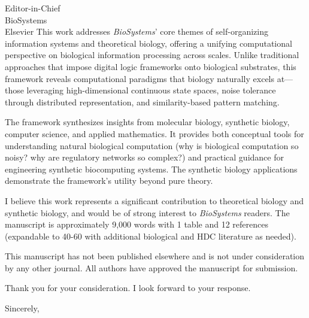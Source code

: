 \documentclass[11pt]{letter}
\begin{document}
\begin{letter}{Editor-in-Chief\\BioSystems\\Elsevier}
This work addresses \textit{BioSystems}' core themes of self-organizing information systems and theoretical biology, offering a unifying computational perspective on biological information processing across scales. Unlike traditional approaches that impose digital logic frameworks onto biological substrates, this framework reveals computational paradigms that biology naturally excels at—those leveraging high-dimensional continuous state spaces, noise tolerance through distributed representation, and similarity-based pattern matching.

The framework synthesizes insights from molecular biology, synthetic biology, computer science, and applied mathematics. It provides both conceptual tools for understanding natural biological computation (why is biological computation so noisy? why are regulatory networks so complex?) and practical guidance for engineering synthetic biocomputing systems. The synthetic biology applications demonstrate the framework's utility beyond pure theory.

I believe this work represents a significant contribution to theoretical biology and synthetic biology, and would be of strong interest to \textit{BioSystems} readers. The manuscript is approximately 9,000 words with 1 table and 12 references (expandable to 40-60 with additional biological and HDC literature as needed).

This manuscript has not been published elsewhere and is not under consideration by any other journal. All authors have approved the manuscript for submission.

Thank you for your consideration. I look forward to your response.

\closing{Sincerely,}

\end{letter}
\end{document}
